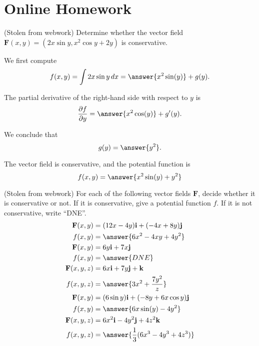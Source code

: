 \documentclass{ximera}
\begin{document}
\section{Online Homework}

\begin{problem}
(Stolen from webwork) Determine whether the vector field $\mathbf{F}(x,y) = (2x\sin y,x^2\cos y + 2y)$ is conservative.

We first compute 
\[
f(x,y)=\int 2x\sin y\, dx = \answer{x^2\sin(y)}+g(y).
\]
\begin{problem}
The partial derivative of the right-hand side with respect to $y$ is
\[
\frac{\partial f}{\partial y} = \answer{x^2\cos(y)}+g'(y).
\]
\begin{problem}
We conclude that
\[
g(y) = \answer{y^2}.
\]
\begin{problem}
The vector field is conservative, and the potential function is
\[
f(x,y) = \answer{x^2\sin(y)+y^2}
\]
\end{problem}
\end{problem}
\end{problem}
\end{problem}

\begin{problem}
(Stolen from webwork) For each of the following vector fields $\mathbf{F}$, decide whether it is conservative or not. If it is conservative, give a potential function $f$. If it is not conservative, write ``DNE''.
\begin{align*}
\mathbf{F}(x,y) &= (12x-4y)\mathbf{i} + (-4x+8y)\mathbf{j}\\
f(x,y) &=  \answer{6x^2-4xy+4y^2}\\
\mathbf{F}(x,y) &= 6y\mathbf{i} + 7x\mathbf{j}\\
f(x,y) &= \answer{DNE}\\
\mathbf{F}(x,y,z) &= 6x\mathbf{i} + 7y\mathbf{j} + \mathbf{k}\\
f(x,y,z) &= \answer{3x^2+\frac{7y^2}{z}}\\
\mathbf{F}(x,y) &=(6\sin y)\mathbf{i} + (-8y+6x\cos y)\mathbf{j}\\
f(x,y) &= \answer{6x\sin(y)-4y^2}\\
\mathbf{F}(x,y,z) &= 6x^2\mathbf{i}-4y^2\mathbf{j}+4z^2\mathbf{k}\\
f(x,y,z) &= \answer{\frac{1}{3}(6x^3-4y^3+4z^3)}
\end{align*}
\end{problem}
\end{document}
